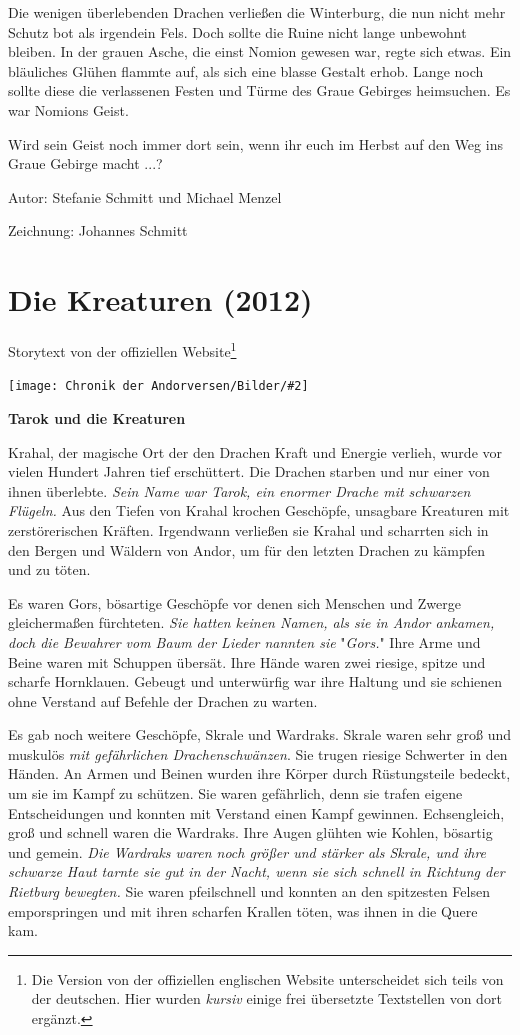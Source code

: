 \documentclass[10pt, a4paper, oneside]{book}
\newcommand{\fillbreak}{\vspace*{\fill}\columnbreak}
\newcommand{\storytext}[1]{%
    \section{#1}%
    \label{Storytext: #1}%
}
\newcommand{\bildmitts}[2][height=0.32\textwidth,width=0.48\textwidth,keepaspectratio]{%
    \begin{center}
        \texttt{[image: Chronik der Andorversen/Bilder/\#2]}
    \end{center}
}
\begin{document}
\begin{multicols}{2}
Die wenigen überlebenden Drachen verließen die Winterburg, die nun nicht mehr Schutz bot als irgendein Fels. Doch sollte die Ruine nicht lange unbewohnt bleiben. In der grauen Asche, die einst Nomion gewesen war, regte sich etwas. Ein bläuliches Glühen flammte auf, als sich eine blasse Gestalt erhob. Lange noch sollte diese die verlassenen Festen und Türme des Graue Gebirges heimsuchen. Es war Nomions Geist.\bigskip

Wird sein Geist noch immer dort sein, wenn ihr euch im Herbst auf den Weg ins Graue Gebirge macht ...?    \bigskip  

Autor: Stefanie Schmitt und Michael Menzel

Zeichnung: Johannes Schmitt



\fillbreak
\storytext{Die Kreaturen (2012)}

\begin{center}
    Storytext von der offiziellen Website\footnote{Die Version von der offiziellen englischen Website unterscheidet sich teils von der deutschen. Hier wurden \textit{kursiv} einige frei übersetzte Textstellen von dort ergänzt.}
\end{center}

\bildmitts{Die Kreaturen Bild 1.jpg}

\textbf{Tarok und die Kreaturen}

Krahal, der magische Ort der den Drachen Kraft und Energie verlieh, wurde vor vielen Hundert Jahren tief erschüttert. Die Drachen starben und nur einer von ihnen überlebte. \textit{Sein Name war Tarok, ein enormer Drache mit schwarzen Flügeln.} Aus den Tiefen von Krahal krochen Geschöpfe, unsagbare Kreaturen mit zerstörerischen Kräften. Irgendwann verließen sie Krahal und scharrten sich in den Bergen und Wäldern von Andor, um für den letzten Drachen zu kämpfen und zu töten.\bigskip

Es waren Gors, bösartige Geschöpfe vor denen sich Menschen und Zwerge gleichermaßen fürchteten. \textit{Sie hatten keinen Namen, als sie in Andor ankamen, doch die Bewahrer vom Baum der Lieder nannten sie }"\textit{Gors.}" Ihre Arme und Beine waren mit Schuppen übersät. Ihre Hände waren zwei riesige, spitze und scharfe Hornklauen. Gebeugt und unterwürfig war ihre Haltung und sie schienen ohne Verstand auf Befehle der Drachen zu warten.\bigskip

Es gab noch weitere Geschöpfe, Skrale und Wardraks. Skrale waren sehr groß und muskulös \textit{mit gefährlichen Drachenschwänzen}. Sie trugen riesige Schwerter in den Händen. An Armen und Beinen wurden ihre Körper durch Rüstungsteile bedeckt, um sie im Kampf zu schützen. Sie waren gefährlich, denn sie trafen eigene Entscheidungen und konnten mit Verstand einen Kampf gewinnen. Echsengleich, groß und schnell waren die Wardraks. Ihre Augen glühten wie Kohlen, bösartig und gemein. \textit{Die Wardraks waren noch größer und stärker als Skrale, und ihre schwarze Haut tarnte sie gut in der Nacht, wenn sie sich schnell in Richtung der Rietburg bewegten.} Sie waren pfeilschnell und konnten an den spitzesten Felsen emporspringen und mit ihren scharfen Krallen töten, was ihnen in die Quere kam.\bigskip


\end{multicols}
\end{document}
